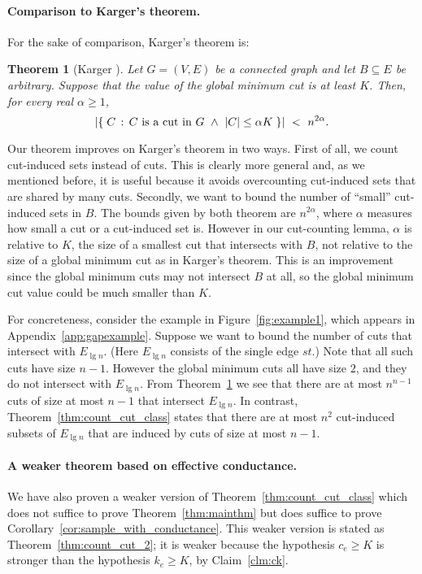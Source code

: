 \documentclass[11pt]{article}
\numberwithin{equation}{section}
\newtheorem{theorem}{Theorem}[section]
\newcommand{\abs}[1]{\lvert #1 \rvert}
\newcommand{\card}[1]{\abs{#1}}
\newcommand{\Appendix}[1]{Appendix~\ref{app:#1}}
\newcommand{\Claim}[1]{Claim~\ref{clm:#1}}
\newcommand{\Corollary}[1]{Corollary~\ref{cor:#1}}
\newcommand{\Figure}[1]{Figure~\ref{fig:#1}}
\newcommand{\TheoremName}[1]{\label{thm:#1}}
\newcommand{\Theorem}[1]{Theorem~\ref{thm:#1}}
\begin{document}
\paragraph{Comparison to Karger's theorem.}
For the sake of comparison, Karger's theorem is:

\begin{theorem}[Karger \protect\cite{KargerContract,KargerStein}]
\TheoremName{karger}
Let $G=(V,E)$ be a connected graph and let $B \subseteq E$ be arbitrary.
Suppose that the value of the global minimum cut is at least $K$.
Then, for every real $\alpha \geq 1$,
$$
\card{ \setst{ C }{ C \text{\normalfont\ is a cut in } G ~\wedge~ \card{C} \leq \alpha K } }
~<~ n^{2\alpha}.
$$
\end{theorem}

Our theorem improves on Karger's theorem in two ways.
First of all, we count cut-induced sets instead of cuts.
This is clearly more general and, as we mentioned before,
it is useful because it avoids overcounting cut-induced sets that are shared by many cuts.
Secondly, we want to bound the number of ``small'' cut-induced sets in $B$.
The bounds given by both theorem are $n^{2\alpha}$,
where $\alpha$ measures how small a cut or a cut-induced set is.
However in our cut-counting lemma, $\alpha$ is 
relative to $K$, the size of a smallest cut that intersects with $B$,
not relative to the size of a global minimum cut as in Karger's theorem.
This is an improvement since the global minimum cuts may not intersect $B$ at all,
so the global minimum cut value could be much smaller than $K$. 

For concreteness, consider the example in \Figure{example1},
which appears in \Appendix{gapexample}.
Suppose we want to bound the number of cuts that intersect with $E_{\lg n}$.
(Here $E_{\lg n}$ consists of the single edge $st$.)
Note that all such cuts have size $n-1$.
However the global minimum cuts all have size $2$, and they do not intersect with $E_{\lg n}$.
From \Theorem{karger} we see that there are at most $n^{n-1}$ cuts of size at most $n-1$
that intersect $E_{\lg n}$.
In contrast, \Theorem{count_cut_class} states that
there are at most $n^2$ cut-induced subsets of $E_{\lg n}$ 
that are induced by cuts of size at most $n-1$.



\paragraph{A weaker theorem based on effective conductance.}
We have also proven a weaker version of \Theorem{count_cut_class} which does not
suffice to prove \Theorem{mainthm} but does suffice to prove
\Corollary{sample_with_conductance}.
This weaker version is stated as \Theorem{count_cut_2};
it is weaker because the hypothesis $c_e \geq K$ is stronger than the hypothesis $k_e \geq K$,
by \Claim{ck}.
\end{document}
